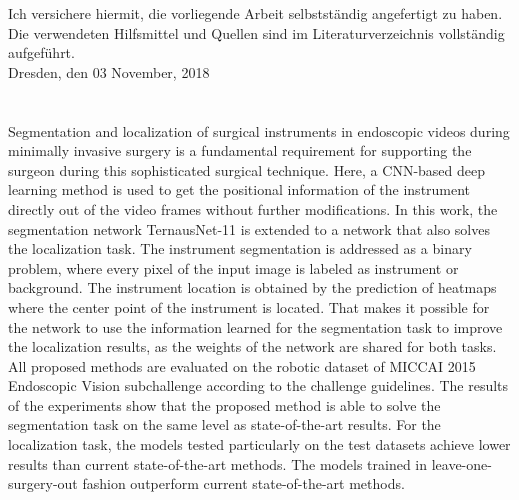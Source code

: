 \documentclass{thesisclass}
\begin{document}
\frontmatter
{}

\blankpage

\thispagestyle{empty}
$\mbox{}$\vspace{15cm}$\mbox{}$\\
Ich versichere hiermit, die vorliegende Arbeit selbstständig angefertigt zu haben. Die verwendeten Hilfsmittel und Quellen sind im Literaturverzeichnis
vollständig aufgeführt.\\
$\mbox{}$\vspace{2cm}$\mbox{}$\\
Dresden, den 03 November, 2018\\
$\mbox{}$\vspace{1cm}$\mbox{}$\\
$\mbox{}$\hfill \\
$\mbox{}$


\clearpage

\newpage
\hfill
\thispagestyle{empty}

\newpage
\thispagestyle{empty}
\chapter*{\centering {}} %
Segmentation and localization of surgical instruments in endoscopic videos during minimally invasive surgery is a fundamental requirement for supporting the surgeon during this sophisticated surgical technique. 
Here, a CNN-based deep learning method is used to get the positional information of the instrument directly
out of the video frames without further modifications.
In this work, the segmentation network TernausNet-11 is extended to a network that also solves the localization task. 
The instrument segmentation is addressed as a binary problem, where every pixel of the input image is labeled as instrument or background. 
The instrument location is obtained by the prediction of heatmaps where the center point of the instrument is located. That makes it possible for the network to use the information learned for the segmentation task to improve the localization results, as the weights of the network are shared for both tasks.
All proposed methods are evaluated on the robotic dataset of MICCAI 2015 Endoscopic Vision subchallenge according to the challenge guidelines.
The results of the experiments show that the proposed method is able to solve the segmentation task on the same level as state-of-the-art results. For the localization task, the models tested particularly on the test datasets achieve lower results than current state-of-the-art methods. The models trained in leave-one-surgery-out fashion outperform current state-of-the-art methods. 
\end{document}
